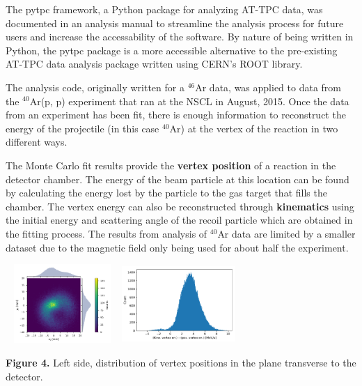 \documentclass[a0paper,portrait]{baposter}
\begin{document}
\begin{poster}
{{The pytpc framework, a Python package for analyzing AT-TPC data, was documented in an analysis manual to streamline the analysis process for future users and increase the accessability of the software. By nature of being written in Python, the pytpc package is a more accessible alternative to the pre-existing AT-TPC data analysis package written using CERN's ROOT library. }
}
{\small{The analysis code, originally written for a $^{46}$Ar data, was applied to data from the $^{40}$Ar(p, p) experiment that ran at the NSCL in August,  2015. Once the data from an experiment has been fit, there is enough information to reconstruct the energy of the projectile (in this case $^{40}$Ar) at the vertex of the reaction in two different ways.}

\small{The Monte Carlo fit results provide the \textbf{vertex position} of a reaction in the detector chamber. The energy of the beam particle at this location can be found by calculating the energy lost by the particle to the gas target that fills the chamber. The vertex energy can also be reconstructed through \textbf{kinematics} using the initial energy and scattering angle of the recoil particle which are obtained in the fitting process. The results from analysis of $^{40}$Ar data are limited by a smaller dataset due to the magnetic field only being used for about half the experiment.}

\begin{center}
\includegraphics [height=30mm, width=43mm] {vertex_pos_distrib.pdf}
\hspace{.5cm}
\includegraphics [height=30mm, width=43mm] {vertex_en_error.pdf}
\end{center}
\small{\textbf{Figure 4.} Left side, distribution of vertex positions in the plane transverse to the detector.}

}
\end{poster}
\end{document}

